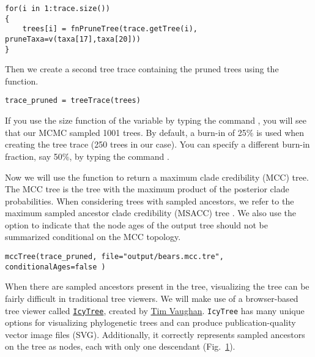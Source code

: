 {\tt \begin{snugshade*}
\begin{lstlisting}
for(i in 1:trace.size())
{
    trees[i] = fnPruneTree(trace.getTree(i), pruneTaxa=v(taxa[17],taxa[20]))
}
\end{lstlisting}
\end{snugshade*}}

Then we create a second tree trace containing the pruned trees using the  function.

{\tt \begin{snugshade*}
\begin{lstlisting}
trace_pruned = treeTrace(trees)
\end{lstlisting}
\end{snugshade*}}

If you use the size function of the  variable by typing the command \colorbox{shadecolor}{}, you will see that our MCMC sampled 1001 trees. 
By default, a burn-in of 25\% is used when creating the tree trace (250 trees in our case). You can specify a different burn-in fraction, say 50\%, by typing the command \colorbox{shadecolor}{}.

Now we will use the  function to return a maximum clade credibility (MCC) tree.
The MCC tree is the tree with the maximum product of the posterior clade probabilities.
When considering trees with sampled ancestors, we refer to the maximum sampled ancestor clade credibility (MSACC) tree \citep{Gavryushkina2016}.
We also use the option  to indicate that the node ages of the output tree should not be summarized conditional on the MCC topology.
{\tt \begin{snugshade*}
\begin{lstlisting}
mccTree(trace_pruned, file="output/bears.mcc.tre", conditionalAges=false )
\end{lstlisting}
\end{snugshade*}}


When there are sampled ancestors present in the tree, visualizing the tree can be fairly difficult in traditional tree viewers.
We will make use of a browser-based tree viewer called \href{http://tgvaughan.github.io/icytree/}{\tt IcyTree}, created by \href{https://github.com/tgvaughan}{Tim Vaughan}.
{\tt IcyTree} has many unique options for visualizing phylogenetic trees and can produce publication-quality vector image files (\IE SVG). 
Additionally, it correctly represents sampled ancestors on the tree as nodes, each with only one descendant (Fig.\ \ref{fig:IcyTreeSumm}). 
\begin{figure}[h!]
\label{fig:IcyTreeSumm}
\end{figure}

